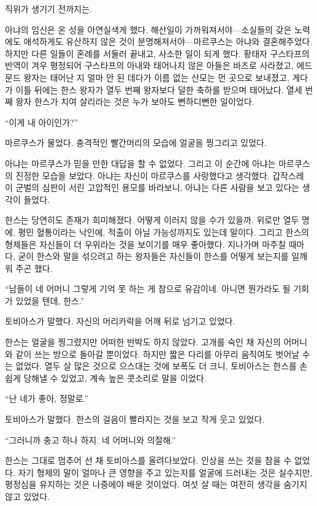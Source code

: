직위가 생기기 전까지는.

아냐의 임신은 온 성을 아연실색게 했다. 해산일이 가까워져서야—소실들의 갖은 노력에도 애석하게도 유산하지 않은 것이 분명해져서야—마르쿠스는 아냐와 결혼해주었다. 하지만 다른 일들이 혼례를 서둘러 끝내고, 사소한 일이 되게 했다. 황태자 구스타프의 반역이 겨우 평정되어 구스타프의 아내와 태어나지 않은 아들은 바즈로 사라졌고, 에드문드 왕자는 태어난 지 얼마 안 된 데다가 이름 없는 산모는 먼 곳으로 보내졌고, 게다가 이틀 뒤에는 한스 왕자가 열두 번째 왕자보다 덜한 축하를 받으며 태어났다. 열세 번째 왕자 한스가 치여 살리라는 것은 누가 보아도 뻔하디뻔한 일이었다.

``이게 내 아이인가?''

마르쿠스가 물었다. 충격적인 빨간머리의 모습에 얼굴을 찡그리고 있었다.

아냐는 마르쿠스가 믿을 만한 대답을 할 수 없었다. 그리고 이 순간에 아냐는 마르쿠스의 진정한 모습을 보았다. 아냐는 자신이 마르쿠스를 사랑했다고 생각했다. 갑작스레 이 군벌의 심판이 서린 고압적인 용모를 바라보니, 아냐는 다른 사람을 보고 있다는 생각이 들었다.

\textbreak

한스는 당연히도 존재가 희미해졌다. 어떻게 이러지 않을 수가 있을까. 위로만 열두 명에, 평민 혈통이라는 낙인에, 적출이 아닐 가능성까지도 있는데 말이다. 그리고 한스의 형제들은 자신들이 더 우위라는 것을 보이기를 매우 좋아했다. 지나가며 마주칠 때마다, 굳이 한스와 말을 섞으려고 하는 왕자들은 자신들이 한스를 어떻게 보는지를 일깨워 주곤 했다.

``남들이 네 어머니 그렇게 기억 못 하는 게 참으로 유감이네. 아니면 뭔가라도 될 기회가 있었을 텐데, 한스.''

토비아스가 말했다. 자신의 머리카락을 어깨 뒤로 넘기고 있었다.

한스는 얼굴을 찡그렸지만 어떠한 반박도 하지 않았다. 고개를 숙인 채 자신의 어머니와 같이 쓰는 방으로 돌아갈 뿐이었다. 하지만 짧은 다리를 아무리 움직여도 벗어날 수는 없었다. 열두 살 많은 것으로 으스대는 것에 보폭도 더 크니, 토비아스는 한스를 손쉽게 당해낼 수 있었고, 계속 높은 콧소리로 말을 이었다.

``난 네가 좋아, 정말로.''

토비아스가 말했다. 한스의 걸음이 빨라지는 것을 보고 작게 웃고 있었다.

``그러니까 충고 하나 하지. 네 어머니와 의절해.''

한스는 그대로 멈추어 선 채 토비아스를 올려다보았다. 인상을 쓰는 것을 참을 수 없었다. 자기 형제의 말이 얼마나 큰 영향을 주고 있는지를 얼굴에 드러내는 것은 실수지만, 평정심을 유지하는 것은 나중에야 배운 것이었다. 여섯 살 때는 여전히 생각을 숨기지 않고 있었다.

